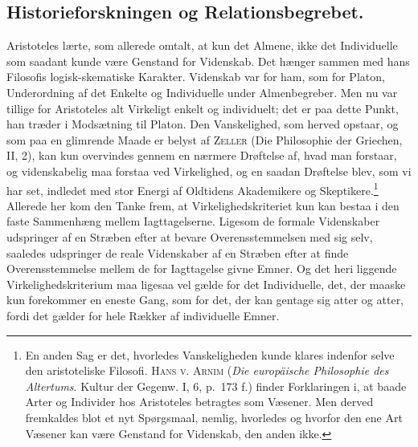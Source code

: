 \documentclass[12pt]{article}
\newcommand{\opage}[1]{\marginnote{\footnotesize\textit{[#1]}}}
\begin{document}
\subsection{Historieforskningen og Relationsbegrebet.}\label{sec:4a}
\noindent
Aristoteles lærte, som allerede omtalt, at kun det Almene, ikke det
Individuelle som saadant kunde være Genstand for Videnskab. Det hænger
sammen med hans Filosofis logisk-skematiske Karakter. Videnskab var for
ham, som for Platon, Underordning af det Enkelte og Individuelle under
Almenbegreber. Men nu var tillige for Aristoteles alt Virkeligt enkelt
og individuelt; det er paa dette Punkt, han træder i Modsætning til
Platon. Den Vanskelighed, som herved opstaar, og som paa en glimrende
Maade er belyst
\opage{78} \setcounter{footnote}{0}
af \textsc{Zeller} (Die Philosophie der Griechen, II, 2), kan kun
overvindes gennem en nærmere Drøftelse af, hvad man forstaar, og
videnskabelig maa forstaa ved Virkelighed, og en saadan Drøftelse blev,
som vi har set, indledet med stor Energi af Oldtidens Akademikere og
Skeptikere.\footnote{En anden Sag er det, hvorledes Vanskeligheden kunde
klares indenfor selve den aristoteliske Filosofi. \textsc{Hans v. Arnim}
(\textit{Die europäische Philosophie des Altertums}. Kultur der Gegenw.
I, 6, p.~173 f.) finder Forklaringen i, at baade Arter og Individer hos
Aristoteles betragtes som \guillemotright Væsener\guillemotleft. Men
derved fremkaldes blot et nyt Spørgsmaal, nemlig, hvorledes og hvorfor
den ene Art \guillemotright Væsener\guillemotleft{} kan være Genstand for
Videnskab, den anden ikke.}
Allerede her kom den Tanke frem, at Virkelighedskriteriet kun kan bestaa
i den faste Sammenhæng mellem Iagttagelserne. Ligesom de formale
Videnskaber udspringer af en Stræben efter at bevare Overensstemmelsen
med sig selv, saaledes udspringer de reale Videnskaber af en Stræben
efter at finde Overensstemmelse mellem de for Iagttagelse givne Emner.
Og det heri liggende Virkelighedskriterium maa ligesaa vel gælde for det
Individuelle, det, der maaske kun forekommer en eneste Gang, som for
det, der kan gentage sig atter og atter, fordi det gælder for hele
Rækker af individuelle Emner.
\end{document}
